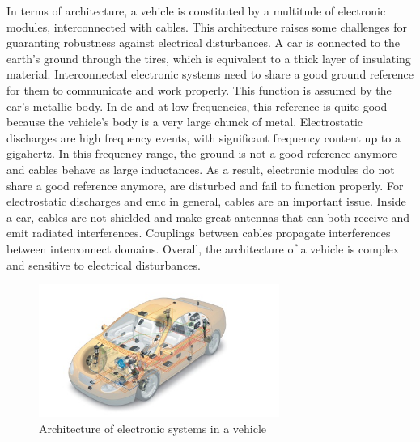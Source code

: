 In terms of architecture, a vehicle is constituted by a multitude of electronic modules, interconnected with cables.
This architecture raises some challenges for guaranting robustness against electrical disturbances.
A car is connected to the earth's ground through the tires, which is equivalent to a thick layer of insulating material.
Interconnected electronic systems need to share a good ground reference for them to communicate and work properly.
This function is assumed by the car's metallic body.
In \gls{dc} and at low frequencies, this reference is quite good because the vehicle's body is a very large chunck of metal.
Electrostatic discharges are high frequency events, with significant frequency content up to a gigahertz.
In this frequency range, the ground is not a good reference anymore and cables behave as large inductances.
As a result, electronic modules do not share a good reference anymore, are disturbed and fail to function properly.
For electrostatic discharges and \gls{emc} in general, cables are an important issue.
Inside a car, cables are not shielded and make great antennas that can both receive and emit radiated interferences.
Couplings between cables propagate interferences between interconnect domains.
Overall, the architecture of a vehicle is complex and sensitive to electrical disturbances.

\begin{figure}[!h]
  \centering
  \includegraphics[width=0.7\textwidth]{src/1/figures/systemintegration_01_uv-data.jpg}
  \caption{Architecture of electronic systems in a vehicle \cite{car-architecture}}
  \label{fig:car-architecture}
\end{figure}

